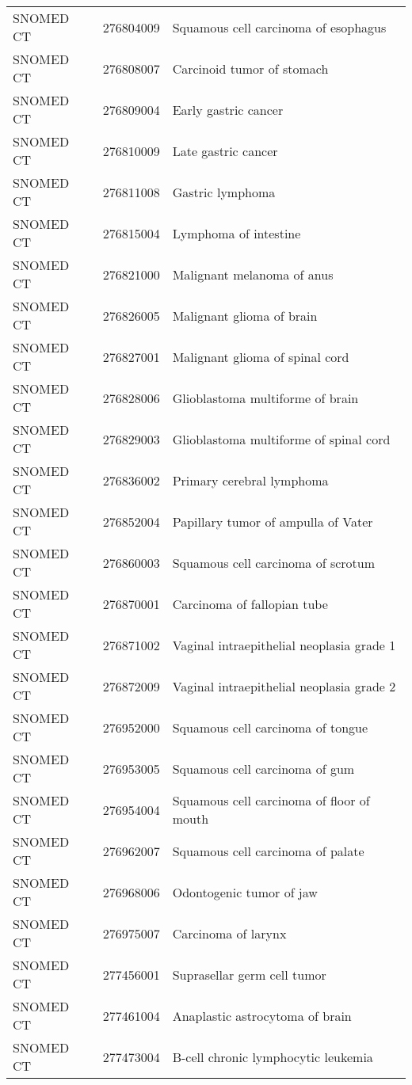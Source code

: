 \begin{longtable}{p{}p{}p{}}
  SNOMED CT & 276804009 & Squamous cell carcinoma of esophagus \\ 
  SNOMED CT & 276808007 & Carcinoid tumor of stomach \\ 
  SNOMED CT & 276809004 & Early gastric cancer \\ 
  SNOMED CT & 276810009 & Late gastric cancer \\ 
  SNOMED CT & 276811008 & Gastric lymphoma \\ 
  SNOMED CT & 276815004 & Lymphoma of intestine \\ 
  SNOMED CT & 276821000 & Malignant melanoma of anus \\ 
  SNOMED CT & 276826005 & Malignant glioma of brain \\ 
  SNOMED CT & 276827001 & Malignant glioma of spinal cord \\ 
  SNOMED CT & 276828006 & Glioblastoma multiforme of brain \\ 
  SNOMED CT & 276829003 & Glioblastoma multiforme of spinal cord \\ 
  SNOMED CT & 276836002 & Primary cerebral lymphoma \\ 
  SNOMED CT & 276852004 & Papillary tumor of ampulla of Vater \\ 
  SNOMED CT & 276860003 & Squamous cell carcinoma of scrotum \\ 
  SNOMED CT & 276870001 & Carcinoma of fallopian tube \\ 
  SNOMED CT & 276871002 & Vaginal intraepithelial neoplasia grade 1 \\ 
  SNOMED CT & 276872009 & Vaginal intraepithelial neoplasia grade 2 \\ 
  SNOMED CT & 276952000 & Squamous cell carcinoma of tongue \\ 
  SNOMED CT & 276953005 & Squamous cell carcinoma of gum \\ 
  SNOMED CT & 276954004 & Squamous cell carcinoma of floor of mouth \\ 
  SNOMED CT & 276962007 & Squamous cell carcinoma of palate \\ 
  SNOMED CT & 276968006 & Odontogenic tumor of jaw \\ 
  SNOMED CT & 276975007 & Carcinoma of larynx \\ 
  SNOMED CT & 277456001 & Suprasellar germ cell tumor \\ 
  SNOMED CT & 277461004 & Anaplastic astrocytoma of brain \\ 
  SNOMED CT & 277473004 & B-cell chronic lymphocytic leukemia \\ 

\end{longtable}
